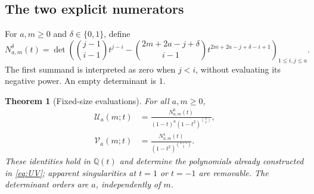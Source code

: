 \documentclass[11pt]{article}
\newtheorem{theorem}{Theorem}[section]
\theoremstyle{definition}
\theoremstyle{remark}
\newcommand{\Q}{\mathbb Q}
\newcommand{\U}{\mathcal U}
\newcommand{\V}{\mathcal V}
\theoremstyle{definition}
\theoremstyle{plain}
\numberwithin{equation}{section}
\begin{document}
\subsection{The two explicit numerators}
For $a,m\ge0$ and $\delta\in\{0,1\}$, define
\begin{equation}
 N^{\delta}_{a,m}(t)=
 \det\left(
 \binom{j-1}{i-1}t^{j-i}
 -\binom{2m+2a-j+\delta}{i-1}
 t^{2m+2a-j+\delta-i+1}
 \right)_{1\le i,j\le a}.
 \label{eq:N}
\end{equation}
The first summand is interpreted as zero when $j<i$, without evaluating
its negative power. An empty determinant is $1$.

\begin{theorem}[Fixed-size evaluations]
\label{thm:alternant}
For all $a,m\ge0$,
\begin{align}
 \U_a(m;t)&=
 \frac{N^0_{a,m}(t)}{(1-t)^a(1-t^2)^{\binom a2}},\label{eq:Uclosed}\\
 \V_a(m;t)&=
 \frac{N^1_{a,m}(t)}{(1-t^2)^{\binom{a+1}{2}}}.
 \label{eq:Vclosed}
\end{align}
These identities hold in $\Q(t)$ and determine the polynomials already
constructed in \eqref{eq:UV}; apparent singularities at $t=1$ or $t=-1$
are removable. The determinant orders are $a$, independently of $m$.
\end{theorem}
\end{document}
